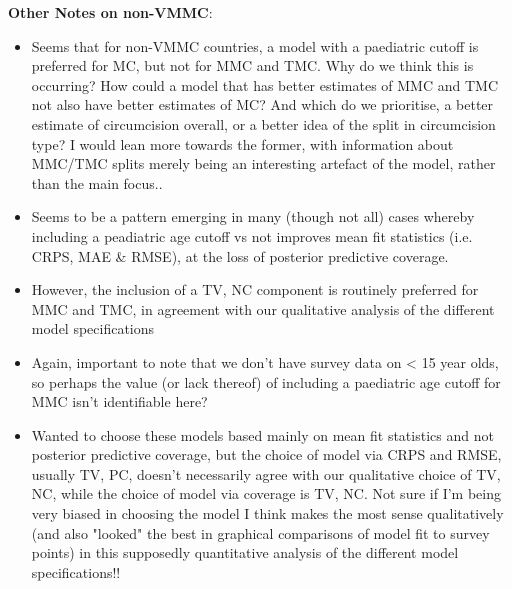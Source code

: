 \documentclass{article}
\begin{document}
\textbf{Other Notes on non-VMMC}:
\begin{itemize}
    \item Seems that for non-VMMC countries, a model with a paediatric cutoff is preferred for MC, but not for MMC and TMC. Why do we think this is occurring? How could a model that has better estimates of MMC and TMC not also have better estimates of MC? And which do we prioritise, a better estimate of circumcision overall, or a better idea of the split in circumcision type? I would lean more towards the former, with information about MMC/TMC splits merely being an interesting artefact of the model, rather than the main focus..
    \item Seems to be a pattern emerging in many (though not all) cases whereby including a peadiatric age cutoff vs not improves mean fit statistics (i.e. CRPS, MAE \& RMSE), at the loss of posterior predictive coverage. %
    \item However, the inclusion of a TV, NC component is routinely preferred for MMC and TMC, in agreement with our qualitative analysis of the different model specifications 
    \item Again, important to note that we don't have survey data on < 15 year olds, so perhaps the value (or lack thereof) of including a paediatric age cutoff for MMC isn't identifiable here?
    \item Wanted to choose these models based mainly on mean fit statistics and not posterior predictive coverage, but the choice of model via CRPS and RMSE, usually TV, PC, doesn't necessarily agree with our qualitative choice of TV, NC, while the choice of model via coverage is TV, NC. Not sure if I'm being very biased in choosing the model I think makes the most sense qualitatively (and also "looked" the best in graphical comparisons of model fit to survey points) in this supposedly quantitative analysis of the different model specifications!!

\end{itemize}



\end{document}
